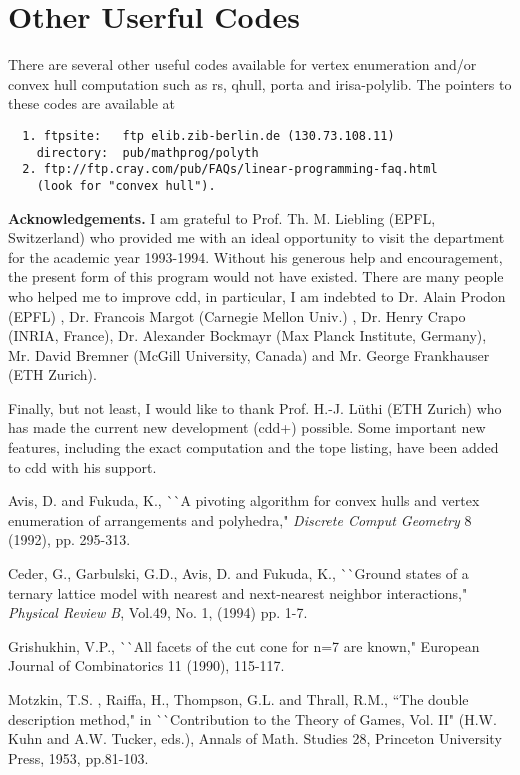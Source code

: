 \section{Other Userful Codes}  \label{CODES}
There are several other useful codes available for vertex enumeration and/or
convex hull computation  such as rs, qhull, porta and irisa-polylib.
The pointers to these codes are available at
\begin{verbatim}
  1. ftpsite:   ftp elib.zib-berlin.de (130.73.108.11)      
    directory:  pub/mathprog/polyth
  2. ftp://ftp.cray.com/pub/FAQs/linear-programming-faq.html
    (look for "convex hull").
\end{verbatim}


\bigskip
\noindent
{\large {\bf Acknowledgements.}} 
I am  grateful to Prof. Th. M. Liebling (EPFL, Switzerland)  who
provided me with an ideal opportunity to visit the department
for the academic year 1993-1994.  Without his 
generous help and encouragement,
the present form of this program would not have existed.
There are many people who helped me to improve cdd,  in particular,
I am indebted to Dr. Alain Prodon (EPFL) , Dr. Francois Margot
(Carnegie Mellon Univ.) , Dr. Henry Crapo (INRIA, France),
Dr. Alexander Bockmayr (Max Planck Institute, Germany), 
Mr. David Bremner (McGill University, Canada)  and
Mr. George Frankhauser (ETH Zurich). 

Finally, but not least, I would like to thank Prof. H.-J. L\"uthi
(ETH Zurich) who has made the current new development (cdd+)
possible.  Some important new features, including the exact computation
and the tope listing, have been added to cdd with his support.

\addtolength{\baselineskip}{-0.5\baselineskip}
\begin{thebibliography}{99}
 Avis, D.  and Fukuda, K., ^^ ^^ A pivoting algorithm
        for convex hulls and vertex enumeration of arrangements
        and polyhedra," {\em Discrete Comput Geometry} 8
        (1992), pp. 295-313.

 Ceder, G., Garbulski, G.D.,  Avis, D. and Fukuda, K., 
^^ ^^ Ground states of a ternary lattice model with nearest
and next-nearest neighbor interactions,"
{\em Physical Review B\/}, Vol.49, No. 1, (1994)  pp. 1-7.

 Grishukhin, V.P., ^^ ^^ All facets of
the cut cone for n=7 are known," European Journal of
Combinatorics 11 (1990), 115-117.

 Motzkin, T.S. , Raiffa, H.,  
Thompson, G.L. and  Thrall, R.M., ``The double description method," 
in  ^^ ^^ Contribution to the Theory of Games, Vol. II"
(H.W. Kuhn and A.W. Tucker, eds.),
Annals of Math. Studies 28,  Princeton University Press, 1953, pp.81-103.

\end{thebibliography}




